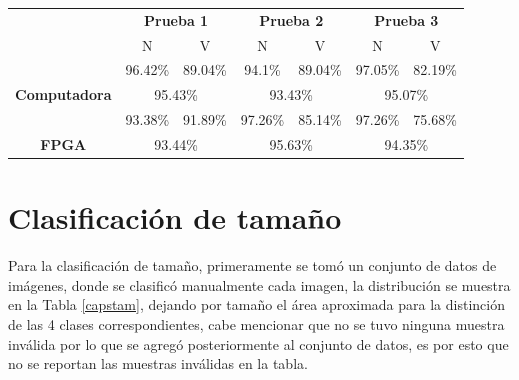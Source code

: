 \documentclass[twoside,spanish,ESP,MSc]{plantillaLabUPV}
\theoremstyle{definition}
\begin{document}
\begin{table}[!tbh]
\begin{tabular}{c|c|c|c|c|c|c|}
	\cline{2-7}
	& \multicolumn{2}{c|}{\textbf{Prueba 1}}              & \multicolumn{2}{c|}{\textbf{Prueba 2}}              & \multicolumn{2}{c|}{\textbf{Prueba 3}}              \\ \cline{2-7} 
	& {\color[HTML]{F56B00} N} & {\color[HTML]{009901} V} & {\color[HTML]{F56B00} N} & {\color[HTML]{009901} V} & {\color[HTML]{F56B00} N} & {\color[HTML]{009901} V} \\ \hline
	\multicolumn{1}{|c|}{}                                       & 96.42\%                  & 89.04\%                  & 94.1\%                   & 89.04\%                  & 97.05\%                  & 82.19\%                  \\ \cline{2-7} 
	\multicolumn{1}{|c|}{\multirow{-2}{*}{\textbf{Computadora}}} & \multicolumn{2}{c|}{95.43\%}                        & \multicolumn{2}{c|}{93.43\%}                        & \multicolumn{2}{c|}{95.07\%}                        \\ \hline
	\multicolumn{1}{|c|}{}                                       & 93.38\%                  & 91.89\%                  & 97.26\%                  & 85.14\%                  & 97.26\%                  & 75.68\%                  \\ \cline{2-7} 
	\multicolumn{1}{|c|}{\multirow{-2}{*}{\textbf{FPGA}}}        & \multicolumn{2}{c|}{93.44\%}                        & \multicolumn{2}{c|}{95.63\%}                        & \multicolumn{2}{c|}{94.35\%}                        \\ \hline
\end{tabular}
\end{table}


\section{Clasificación de tamaño}

Para la clasificación de tamaño, primeramente se tomó un conjunto de datos de imágenes, donde se clasificó manualmente cada imagen, la distribución se muestra en la Tabla \ref{capstam}, dejando por tamaño el área aproximada para la distinción de las 4 clases correspondientes, cabe mencionar que no se tuvo ninguna muestra inválida por lo que se agregó posteriormente al conjunto de datos, es por esto que no se reportan las muestras inválidas en la tabla.
\end{document}
